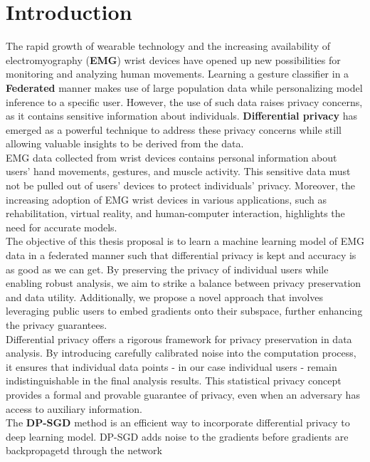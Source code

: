 \chapter{Introduction}

The rapid growth of wearable technology and the increasing availability of electromyography (\textbf{EMG}) wrist devices have opened up new possibilities for monitoring and analyzing human movements. Learning a gesture classifier in a \textbf{Federated} manner makes use of large population data while personalizing model inference to a specific user. However, the use of such data raises privacy concerns, as it contains sensitive information about individuals. \textbf{Differential privacy} \cite{Dwork2013ThePrivacy} has emerged as a powerful technique to address these privacy concerns while still allowing valuable insights to be derived from the data.\\

EMG data collected from wrist devices contains personal information about users' hand movements, gestures, and muscle activity. This sensitive data must not be pulled out of users' devices to protect individuals' privacy. Moreover, the increasing adoption of EMG wrist devices in various applications, such as rehabilitation, virtual reality, and human-computer interaction, highlights the need for accurate models.\\

The objective of this thesis proposal is to learn a machine learning model of EMG data in a federated manner such that differential privacy is kept and accuracy is as good as we can get. By preserving the privacy of individual users while enabling robust analysis, we aim to strike a balance between privacy preservation and data utility. Additionally, we propose a novel approach that involves leveraging public users to embed gradients onto their subspace, further enhancing the privacy guarantees.\\

Differential privacy offers a rigorous framework for privacy preservation in data analysis. By introducing carefully calibrated noise into the computation process, it ensures that individual data points - in our case individual users -  remain indistinguishable in the final analysis results. This statistical privacy concept provides a formal and provable guarantee of privacy, even when an adversary has access to auxiliary information.\\

The \textbf{DP-SGD} \cite{Abadi2016DeepPrivacy} method is an efficient way to incorporate differential privacy to deep learning model. DP-SGD adds noise to the gradients before gradients are backpropagetd through the network 

